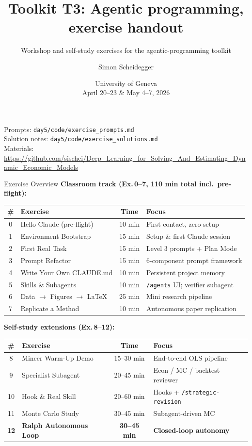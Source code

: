 \documentclass[aspectratio=169,10pt]{beamer}
\title[Toolkit T3]{Toolkit T3: Agentic programming, exercise handout}
\subtitle{Workshop and self-study exercises for the agentic-programming toolkit}
\author{Simon Scheidegger}
\institute[HEC Lausanne]{HEC, University of Lausanne}
\date{University of Geneva\\April 20--23 \& May 4--7, 2026}
\newcommand{\emphc}[1]{\textcolor{harvardcrimson}{#1}}
\begin{document}
{
\begin{frame}
\titlepage
\begin{center}
{\footnotesize Prompts: \texttt{day5/code/exercise\_prompts.md}\\
Solution notes: \texttt{day5/code/exercise\_solutions.md}\\[2pt]
Materials: \url{https://github.com/sischei/Deep_Learning_for_Solving_And_Estimating_Dynamic_Economic_Models}}
\end{center}
\end{frame}}

\begin{frame}{Exercise Overview}
\scriptsize
\textbf{Classroom track (Ex.\,0--7, 110 min total incl.\ pre-flight):}
\renewcommand{\arraystretch}{1.05}
\begin{center}
\begin{tabular}{c l c l}
\toprule
\textbf{\#} & \textbf{Exercise} & \textbf{Time} & \textbf{Focus} \\
\midrule
0 & Hello Claude (\emphc{pre-flight}) & 10 min & First contact, zero setup \\
1 & Environment Bootstrap & 15 min & Setup \& first Claude session \\
2 & First Real Task & 15 min & Level 3 prompts + Plan Mode \\
3 & Prompt Refactor & 15 min & 6-component prompt framework \\
4 & Write Your Own CLAUDE.md & 10 min & Persistent project memory \\
5 & Skills \& Subagents & 10 min & \texttt{/agents} UI; verifier subagent \\
6 & Data $\to$ Figures $\to$ LaTeX & 25 min & Mini research pipeline \\
7 & Replicate a Method & 10 min & Autonomous paper replication \\
\bottomrule
\end{tabular}
\end{center}

\vspace{0.4em}
\textbf{Self-study extensions (Ex.\,8--12):}
\begin{center}
\begin{tabular}{c l c l}
\toprule
\textbf{\#} & \textbf{Exercise} & \textbf{Time} & \textbf{Focus} \\
\midrule
8  & Mincer Warm-Up Demo & 15--30 min & End-to-end OLS pipeline \\
9  & Specialist Subagent & 20--45 min & Econ / MC / backtest reviewer \\
10 & Hook \& Real Skill & 20--60 min & Hooks + \texttt{/strategic-revision} \\
11 & Monte Carlo Study & 30--45 min & Subagent-driven MC \\
\textbf{12} & \textbf{Ralph Autonomous Loop} & \textbf{30--45 min} & \textbf{Closed-loop autonomy} \\
\bottomrule
\end{tabular}
\end{center}


\end{frame}
\end{document}
